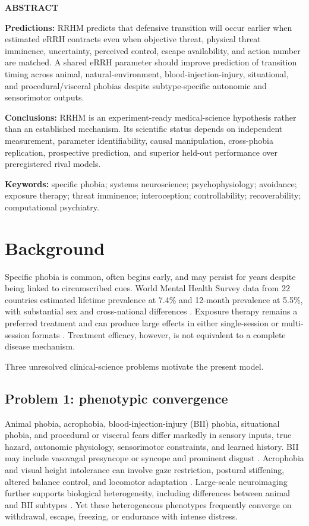 \documentclass[9pt,twocolumn]{article}
\renewenvironment{abstract}
{\small\noindent\textsf{\bfseries\color{RRHMNavy}ABSTRACT}\par\smallskip\noindent}
{\par\vspace{0.5em}}
\begin{document}
\begin{strip}
\begin{abstract}
\textbf{Predictions:} RRHM predicts that defensive transition will occur earlier when estimated eRRH contracts even when objective threat, physical threat imminence, uncertainty, perceived control, escape availability, and action number are matched. A shared eRRH parameter should improve prediction of transition timing across animal, natural-environment, blood-injection-injury, situational, and procedural/visceral phobias despite subtype-specific autonomic and sensorimotor outputs.

\textbf{Conclusions:} RRHM is an experiment-ready medical-science hypothesis rather than an established mechanism. Its scientific status depends on independent measurement, parameter identifiability, causal manipulation, cross-phobia replication, prospective prediction, and superior held-out performance over preregistered rival models.
\end{abstract}\end{strip}

\noindent\textbf{Keywords:} specific phobia; systems neuroscience; psychophysiology; avoidance; exposure therapy; threat imminence; interoception; controllability; recoverability; computational psychiatry.

\section{Background}
Specific phobia is common, often begins early, and may persist for years despite being linked to circumscribed cues. World Mental Health Survey data from 22 countries estimated lifetime prevalence at 7.4\% and 12-month prevalence at 5.5\%, with substantial sex and cross-national differences \cite{wardenaar2017}. Exposure therapy remains a preferred treatment and can produce large effects in either single-session or multi-session formats \cite{odgers2022}. Treatment efficacy, however, is not equivalent to a complete disease mechanism.

Three unresolved clinical-science problems motivate the present model.

\subsection{Problem 1: phenotypic convergence}
Animal phobia, acrophobia, blood-injection-injury (BII) phobia, situational phobia, and procedural or visceral fears differ markedly in sensory inputs, true hazard, autonomic physiology, sensorimotor constraints, and learned history. BII may include vasovagal presyncope or syncope and prominent disgust \cite{ducasse2013,ayala2009,ritz2010}. Acrophobia and visual height intolerance can involve gaze restriction, postural stiffening, altered balance control, and locomotor adaptation \cite{huppert2020,wuehr2015}. Large-scale neuroimaging further supports biological heterogeneity, including differences between animal and BII subtypes \cite{hilbert2024}. Yet these heterogeneous phenotypes frequently converge on withdrawal, escape, freezing, or endurance with intense distress.
\end{document}
